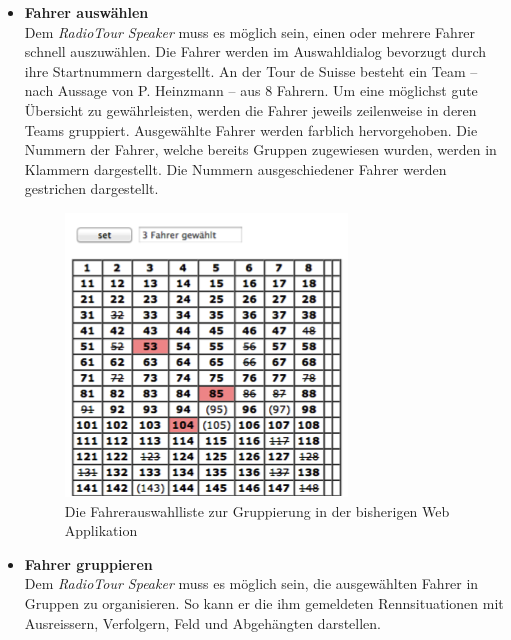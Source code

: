 \begin{itemize}
\item \textbf{Fahrer auswählen}\\
Dem \textit{RadioTour Speaker} muss es möglich sein, einen oder mehrere Fahrer schnell auszuwählen. Die Fahrer werden im Auswahldialog bevorzugt durch ihre Startnummern dargestellt. An der Tour de Suisse besteht ein Team – nach Aussage von P. Heinzmann – aus 8 Fahrern. Um eine möglichst gute Übersicht zu gewährleisten, werden die Fahrer jeweils zeilenweise in deren Teams gruppiert. Ausgewählte Fahrer werden farblich hervorgehoben. Die Nummern der Fahrer, welche bereits Gruppen zugewiesen wurden, werden in Klammern dargestellt. Die Nummern ausgeschiedener Fahrer werden gestrichen dargestellt.

\begin{figure}[h!]
  \caption{Die Fahrerauswahlliste zur Gruppierung in der bisherigen Web Applikation}
  \begin{center}
    \includegraphics{05bericht/images/uc01_fahrerliste.png}
  \end{center}
\end{figure}

\item \textbf{Fahrer gruppieren}\\
Dem \textit{RadioTour Speaker} muss es möglich sein, die ausgewählten Fahrer in Gruppen zu organisieren. So kann er die ihm gemeldeten Rennsituationen mit Ausreissern, Verfolgern, Feld und Abgehängten darstellen.


\end{itemize}
